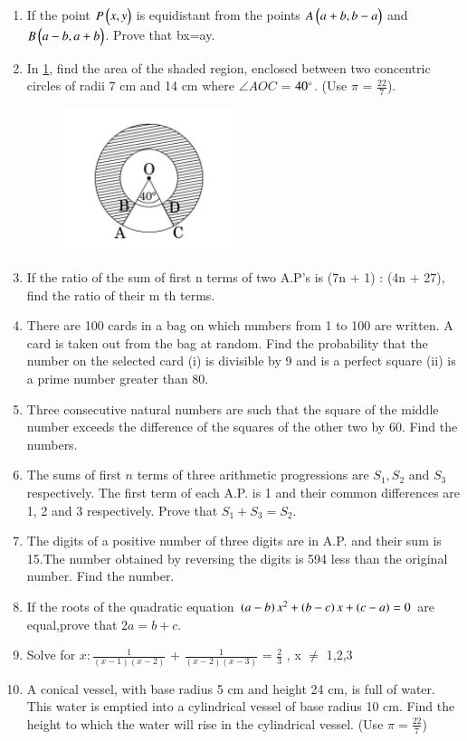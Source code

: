 \documentclass[book,11pt,onecolumn]{IEEEtran}
\begin{document}
\begin{enumerate}
\item  If the point $P\begin{pmatrix}x, y\end{pmatrix}$ is equidistant from the points $A\begin{pmatrix}a+b, b-a\end{pmatrix}$ and $B\begin{pmatrix}a-b, a+b\end{pmatrix}$. Prove that bx=ay.\\
   
\item  In \ref{figure_6}, find the area of the shaded region, enclosed between two concentric circles of radii 7 cm and 14 cm where $\angle AOC$ = $40\degree$. (Use $\pi$ = $\frac{22}{7}$).
	\begin{figure}[H]
      \centering
      \includegraphics[width=5cm]{figs/6.png}
      \caption{}
      \label{figure_6}
\end{figure} 

\item  If the ratio of the sum of first n terms of two A.P's is (7n + 1) : (4n + 27), find the ratio of their m th terms.\\
\item There are 100 cards in a bag on which numbers from 1 to 100 are written. A card is taken out from the bag at random. Find the probability that the number on the selected card (i) is divisible by 9 and is a perfect square
(ii) is a prime number greater than 80.\\
\item Three consecutive natural numbers are such that the square of the middle number exceeds the difference of the squares of the other two by 60. Find the numbers.\\
\item The sums of first $n$ terms of three arithmetic progressions are $S_1, S_2$ and $S_3$ respectively. The first term of each A.P. is 1 and their common differences are 1, 2 and 3 respectively. Prove that $S_1+S_3=S_2$.\\
\item The digits of a positive number of three digits are in A.P. and their sum is 15.The number obtained by reversing the digits is 594 less than the original number. Find the number.\\
\item If the roots of the quadratic equation $\left(a-b\right)x^2+\left(b-c\right)x+\left(c-a\right)=0$ are equal,prove that $2a=b+c$.\\
\item  Solve for $ x :  \frac{1}{(x-1)(x-2)} $ + $ \frac{1}{(x-2)(x-3)} $ = $ \frac{2}{3}$ , x $\neq$ 1,2,3   \\     
\item  A conical vessel, with base radius 5 cm and height 24 cm, is full of water. This water is emptied into a cylindrical vessel of base radius 10 cm. Find the height to which the water will rise in the cylindrical vessel. (Use $ \pi  = \frac{22}{7}$)\\


\end{enumerate}
\end{document}
